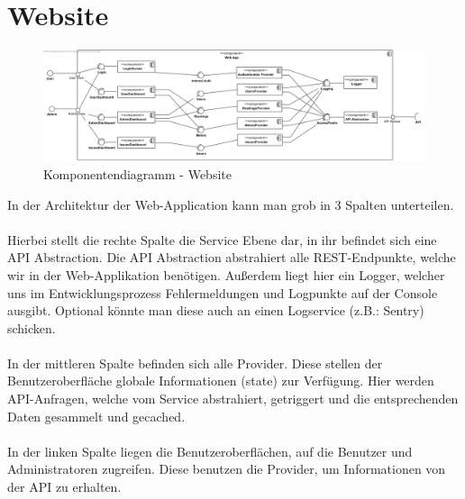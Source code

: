 
\section{Website}

\begin{figure}[h]
	\includegraphics[scale = 0.45]{./img/diagrams/Website-Components} 	
	\caption{Komponentendiagramm - Website} 
\end{figure}
In der Architektur der Web-Application kann man grob in 3 Spalten unterteilen. 
\\ \\
Hierbei stellt die rechte Spalte die Service Ebene dar, in ihr befindet sich eine API Abstraction. Die API Abstraction abstrahiert alle REST-Endpunkte, welche wir in der Web-Applikation benötigen. Außerdem liegt hier ein Logger, welcher uns im Entwicklungsprozess Fehlermeldungen und Logpunkte auf der Console ausgibt. Optional könnte man diese auch an einen Logservice (z.B.: Sentry) schicken.
\\ \\
In der mittleren Spalte befinden sich alle Provider. Diese stellen der Benutzeroberfläche globale Informationen (state) zur Verfügung. Hier werden API-Anfragen, welche vom Service abstrahiert, getriggert und die entsprechenden Daten gesammelt und gecached.
\\ \\
In der linken Spalte liegen die Benutzeroberflächen, auf die Benutzer und Administratoren zugreifen. Diese benutzen die Provider, um Informationen von der API zu erhalten.
\newpage
